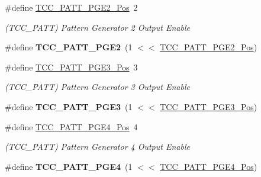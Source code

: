 \begin{DoxyCompactItemize}
\item 
\hypertarget{group___s_a_m_l21___t_c_c_ga037a6a960bbe44e2b559030ab1f59ffd}{}\#define \hyperlink{group___s_a_m_l21___t_c_c_ga037a6a960bbe44e2b559030ab1f59ffd}{T\+C\+C\+\_\+\+P\+A\+T\+T\+\_\+\+P\+G\+E2\+\_\+\+Pos}~2\label{group___s_a_m_l21___t_c_c_ga037a6a960bbe44e2b559030ab1f59ffd}

\begin{DoxyCompactList}\small\item\em (T\+C\+C\+\_\+\+P\+A\+T\+T) Pattern Generator 2 Output Enable \end{DoxyCompactList}\item 
\hypertarget{group___s_a_m_l21___t_c_c_ga70c6f50e7cd06f3a72ca42da6667e5a0}{}\#define {\bfseries T\+C\+C\+\_\+\+P\+A\+T\+T\+\_\+\+P\+G\+E2}~(1 $<$$<$ \hyperlink{group___s_a_m_l21___t_c_c_ga037a6a960bbe44e2b559030ab1f59ffd}{T\+C\+C\+\_\+\+P\+A\+T\+T\+\_\+\+P\+G\+E2\+\_\+\+Pos})\label{group___s_a_m_l21___t_c_c_ga70c6f50e7cd06f3a72ca42da6667e5a0}

\item 
\hypertarget{group___s_a_m_l21___t_c_c_ga0a64b43df8bb7032b26dcd912ba7e885}{}\#define \hyperlink{group___s_a_m_l21___t_c_c_ga0a64b43df8bb7032b26dcd912ba7e885}{T\+C\+C\+\_\+\+P\+A\+T\+T\+\_\+\+P\+G\+E3\+\_\+\+Pos}~3\label{group___s_a_m_l21___t_c_c_ga0a64b43df8bb7032b26dcd912ba7e885}

\begin{DoxyCompactList}\small\item\em (T\+C\+C\+\_\+\+P\+A\+T\+T) Pattern Generator 3 Output Enable \end{DoxyCompactList}\item 
\hypertarget{group___s_a_m_l21___t_c_c_ga5708801274e4f76d32fe6ac9b41882e6}{}\#define {\bfseries T\+C\+C\+\_\+\+P\+A\+T\+T\+\_\+\+P\+G\+E3}~(1 $<$$<$ \hyperlink{group___s_a_m_l21___t_c_c_ga0a64b43df8bb7032b26dcd912ba7e885}{T\+C\+C\+\_\+\+P\+A\+T\+T\+\_\+\+P\+G\+E3\+\_\+\+Pos})\label{group___s_a_m_l21___t_c_c_ga5708801274e4f76d32fe6ac9b41882e6}

\item 
\hypertarget{group___s_a_m_l21___t_c_c_gac69eb351a77d79ac5e118271722564b4}{}\#define \hyperlink{group___s_a_m_l21___t_c_c_gac69eb351a77d79ac5e118271722564b4}{T\+C\+C\+\_\+\+P\+A\+T\+T\+\_\+\+P\+G\+E4\+\_\+\+Pos}~4\label{group___s_a_m_l21___t_c_c_gac69eb351a77d79ac5e118271722564b4}

\begin{DoxyCompactList}\small\item\em (T\+C\+C\+\_\+\+P\+A\+T\+T) Pattern Generator 4 Output Enable \end{DoxyCompactList}\item 
\hypertarget{group___s_a_m_l21___t_c_c_gac872b86e219744de07e8b9d97994d530}{}\#define {\bfseries T\+C\+C\+\_\+\+P\+A\+T\+T\+\_\+\+P\+G\+E4}~(1 $<$$<$ \hyperlink{group___s_a_m_l21___t_c_c_gac69eb351a77d79ac5e118271722564b4}{T\+C\+C\+\_\+\+P\+A\+T\+T\+\_\+\+P\+G\+E4\+\_\+\+Pos})\label{group___s_a_m_l21___t_c_c_gac872b86e219744de07e8b9d97994d530}


\end{DoxyCompactItemize}
